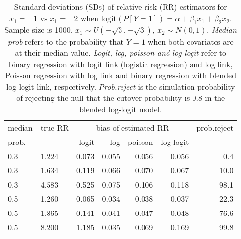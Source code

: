 \documentclass[12pt,a4paper]{article}
\begin{document}
\begin{table}[H] 
\small\sf\centering 
\caption{Standard deviations (SDs) of relative risk (RR) estimators for $x_1=-1$ vs $x_1=-2$ when $\mbox{logit}(P[Y=1])=\alpha+\beta_1 x_1 + \beta_2 x_2$. Sample size is 1000. $x_1 \sim $$U(-\sqrt{3},-\sqrt{3})$, $x_2 \sim N(0,1)$. {\it Median prob} refers to the probability that $Y=1$ when both covariates are at their median value. {\it Logit, log, poisson and log-logit} refer to binary regression with logit link (logistic regression) and log link, Poisson regression with log link and binary regression with blended log-logit link, respectively. {\it Prob.reject} is the simulation probability of rejecting the null that the cutover probability is $0.8$ in the blended log-logit model.} 
\begin{tabular}{llrrrrr} 
\toprule 
median & true RR & \multicolumn{4}{c}{bias of estimated RR} & prob.reject \\ 
prob. & & logit & log & poisson & log-logit  & \\ \midrule 
0.3 & 1.224 & 0.073 & 0.055 & 0.056 & 0.056 &  0.4 \\  
0.3 & 1.634 & 0.119 & 0.066 & 0.070 & 0.067 & 10.0 \\  
0.3 & 4.583 & 0.525 & 0.075 & 0.106 & 0.118 & 98.1 \\  
0.5 & 1.260 & 0.065 & 0.034 & 0.038 & 0.037 & 22.3 \\  
0.5 & 1.865 & 0.141 & 0.041 & 0.047 & 0.048 & 76.6 \\  
0.5 & 8.200 & 1.185 & 0.035 & 0.069 & 0.169 & 99.8 \\  
\bottomrule 
\end{tabular} 
\end{table} 
\end{document}
